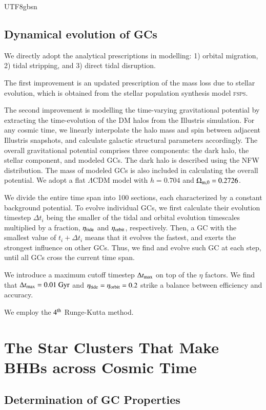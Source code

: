 \documentclass[trackchanges, twocolappendix, twocolumn]{aastex701}
\begin{document}
\begin{CJK*}{UTF8}{gbsn}
\subsection{Dynamical evolution of GCs} \label{subsect:DF}

We directly adopt the analytical prescriptions in modelling: 1) orbital migration, 2) tidal stripping, and 3) direct tidal disruption.

The first improvement is an updated prescription of the mass loss due to stellar evolution, which is obtained from the stellar population synthesis model \textsc{fsps}.

The second improvement is modelling the time-varying gravitational potential by extracting the time-evolution of the DM halos from the Illustris simulation. For any cosmic time, we linearly interpolate the halo mass and spin between adjacent Illustris snapshots, and calculate galactic structural parameters accordingly. The overall gravitational potential comprises three components: the dark halo, the stellar component, and modeled GCs. The dark halo is described using the NFW distribution. The mass of modeled GCs is also included in calculating the overall potential. We adopt a flat $\Lambda$CDM model with $h = 0.704$ and $\Omega_{\rm m, 0} = 0.2726$.

We divide the entire time span into 100 sections, each characterized by a constant background potential. To evolve individual GCs, we first calculate their evolution timestep $\Delta t_i$ being the smaller of the tidal and orbital evolution timescales multiplied by a fraction, $\eta_{\rm tide}$ and $\eta_{\rm orbit}$, respectively. Then, a GC with the smallest value of $t_i + \Delta t_i$ means that it evolves the fastest, and exerts the strongest influence on other GCs. Thus, we find and evolve such GC at each step, until all GCs cross the current time span.

We introduce a maximum cutoff timestep $\Delta t_{\rm max}$ on top of the $\eta$ factors. We find that $\Delta t_{\rm max} = 0.01~\rm Gyr$ and $\eta_{\rm tide} = \eta_{\rm orbit} = 0.2$ strike a balance between efficiency and accuracy.

We employ the $4^{\rm th}$ Runge-Kutta method.

\section{The Star Clusters That Make BHBs across Cosmic Time}

\subsection{Determination of GC Properties}


\end{CJK*}
\end{document}

